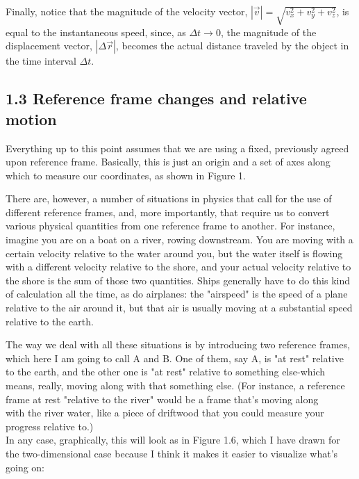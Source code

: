 \documentclass[10pt]{article}
\begin{document}
Finally, notice that the magnitude of the velocity vector, $|\vec{v}|=\sqrt{v_{x}^{2}+v_{y}^{2}+v_{z}^{2}}$, is equal to the instantaneous speed, since, as $\Delta t \rightarrow 0$, the magnitude of the displacement vector, $|\Delta \vec{r}|$, becomes the actual distance traveled by the object in the time interval $\Delta t$.

\subsection*{1.3 Reference frame changes and relative motion}
Everything up to this point assumes that we are using a fixed, previously agreed upon reference frame. Basically, this is just an origin and a set of axes along which to measure our coordinates, as shown in Figure 1.

There are, however, a number of situations in physics that call for the use of different reference frames, and, more importantly, that require us to convert various physical quantities from one reference frame to another. For instance, imagine you are on a boat on a river, rowing downstream. You are moving with a certain velocity relative to the water around you, but the water itself is flowing with a different velocity relative to the shore, and your actual velocity relative to the shore is the sum of those two quantities. Ships generally have to do this kind of calculation all the time, as do airplanes: the "airspeed" is the speed of a plane relative to the air around it, but that air is usually moving at a substantial speed relative to the earth.

The way we deal with all these situations is by introducing two reference frames, which here I am going to call A and B. One of them, say A, is "at rest" relative to the earth, and the other one is "at rest" relative to something else-which means, really, moving along with that something else. (For instance, a reference frame at rest "relative to the river" would be a frame that's moving along\\
with the river water, like a piece of driftwood that you could measure your progress relative to.)\\
In any case, graphically, this will look as in Figure 1.6, which I have drawn for the two-dimensional case because I think it makes it easier to visualize what's going on:
\end{document}
